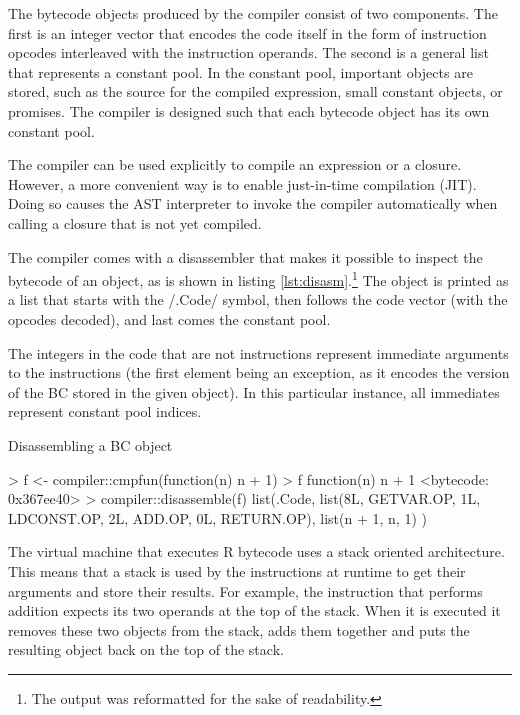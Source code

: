{The bytecode objects produced by the compiler consist of two components. The first is an integer vector that encodes the code itself in the form of instruction opcodes interleaved with the instruction operands. The second is a general list that represents a constant pool. In the constant pool, important objects are stored, such as the source for the compiled expression, small constant objects, or promises. The compiler is designed such that each bytecode object has its own constant pool.

The compiler can be used explicitly to compile an expression or a closure. However, a more convenient way is to enable just-in-time compilation (JIT). Doing so causes the AST interpreter to invoke the compiler automatically when calling a closure that is not yet compiled.

The compiler comes with a disassembler that makes it possible to inspect the bytecode of an object, as is shown in listing \ref{lst:disasm}.\footnote{The output was reformatted for the sake of readability.} The object is printed as a list that starts with the \rinline/.Code/ symbol, then follows the code vector (with the opcodes decoded), and last comes the constant pool.

The integers in the code that are not instructions represent immediate arguments to the instructions (the first element being an exception, as it encodes the version of the BC stored in the given object). In this particular instance, all immediates represent constant pool indices.

\begin{listing}[htbp]
  \caption{\label{lst:disasm}Disassembling a BC object}
  \begin{rcode}
> f <- compiler::cmpfun(function(n) n + 1)
> f
function(n) n + 1
<bytecode: 0x367ee40>
> compiler::disassemble(f)
list(.Code,
     list(8L,
          GETVAR.OP, 1L,
          LDCONST.OP, 2L,
          ADD.OP, 0L,
          RETURN.OP),
     list(n + 1,
          n,
          1)
)
  \end{rcode}
\end{listing}

The virtual machine that executes R bytecode uses a stack oriented architecture. This means that a stack is used by the instructions at runtime to get their arguments and store their results. For example, the instruction that performs addition expects its two operands at the top of the stack. When it is executed it removes these two objects from the stack, adds them together and puts the resulting object back on the top of the stack.

}
